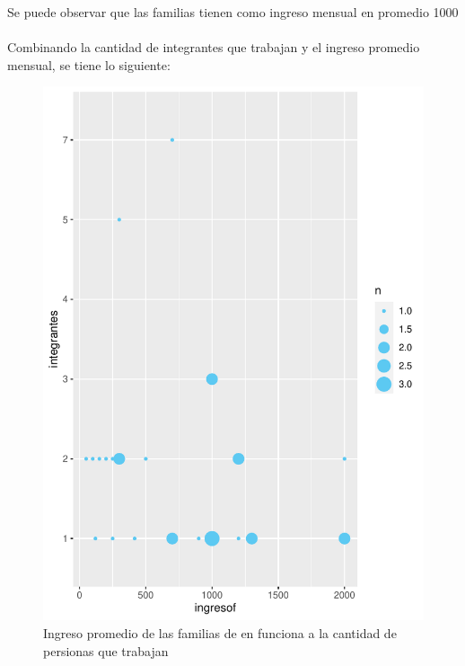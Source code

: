 \documentclass[12pt]{article}\usepackage[]{graphicx}\usepackage[]{xcolor}
\makeatletter
\def\maxwidth{ %
  \ifdim\Gin@nat@width>\linewidth
    \linewidth
  \else
    \Gin@nat@width
  \fi
}
\newenvironment{kframe}{%
 \def\at@end@of@kframe{}%
 \ifinner\ifhmode%
  \def\at@end@of@kframe{\end{minipage}}%
  \begin{minipage}{\columnwidth}%
 \fi\fi%
 \def\FrameCommand##1{\hskip\@totalleftmargin \hskip-\fboxsep
 \colorbox{shadecolor}{##1}\hskip-\fboxsep
     \hskip-\linewidth \hskip-\@totalleftmargin \hskip\columnwidth}%
 \MakeFramed {\advance\hsize-\width
   \@totalleftmargin\z@ \linewidth\hsize
   \@setminipage}}%
 {\par\unskip\endMakeFramed%
 \at@end@of@kframe}
\newenvironment{knitrout}{}{} %
\makeatother
\begin{document}
	Se puede observar que las familias tienen como ingreso mensual en promedio 1000\\
	\\
	Combinando la cantidad de integrantes que trabajan y el ingreso promedio mensual, se tiene lo siguiente:
	
	\begin{figure}[H]
	\centering
\begin{knitrout}
\color{fgcolor}\begin{kframe}


{\ttfamily\noindent\color{warningcolor}{\#\# Warning: NAs introducidos por coerción}}

{\ttfamily\noindent\color{warningcolor}{\#\# Warning: Removed 11 rows containing non-finite values (`stat\_sum()`).}}\end{kframe}
\includegraphics[width=\maxwidth]{figure/nose-1} 
\end{knitrout}
	\caption{Ingreso promedio de las familias de \comunidad en funciona a la cantidad de persionas que trabajan}
	\end{figure}
\end{document}
